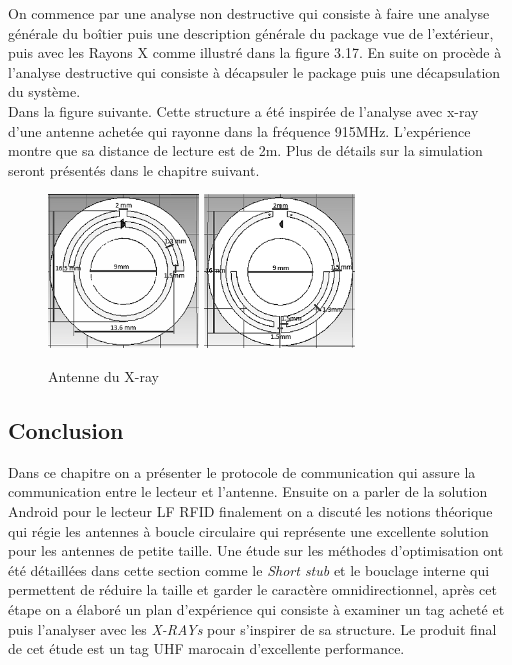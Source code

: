 \documentclass[11pt, a4paper, twoside]{book}
\begin{document}
On commence par une analyse non destructive qui consiste à faire une analyse générale du boîtier puis une description générale du package vue de l’extérieur, puis avec les Rayons X comme illustré dans la figure 3.17. En suite on procède à l'analyse destructive qui consiste à décapsuler le package puis une décapsulation du système.\\

Dans la figure suivante. Cette structure a été inspirée de l'analyse avec x-ray d'une antenne achetée qui rayonne dans la fréquence 915MHz. L'expérience montre que sa distance de lecture est de 2m. Plus de détails sur la simulation seront présentés dans le chapitre suivant.\\

\begin{figure}[H]
\centering
\includegraphics[width=4cm]{front11}
\includegraphics[width=4cm]{back22}
\caption{Antenne du X-ray}
\end{figure}
\subsection{Conclusion}
Dans ce chapitre on a présenter le protocole de communication qui assure la communication entre le lecteur et l'antenne. Ensuite on a parler de la solution Android pour le lecteur LF RFID finalement on a discuté les notions théorique qui régie les antennes à boucle circulaire qui représente une excellente solution pour les antennes de petite taille. Une étude sur les méthodes d'optimisation ont été détaillées dans cette section comme le \emph{Short stub} et le bouclage interne qui permettent de réduire la taille et garder le caractère omnidirectionnel, après cet étape on a élaboré un plan d'expérience qui consiste à examiner un tag acheté et puis l'analyser avec les \emph{X-RAYs} pour s'inspirer de sa structure. Le produit final de cet étude est un tag UHF marocain d'excellente performance.
\end{document}
